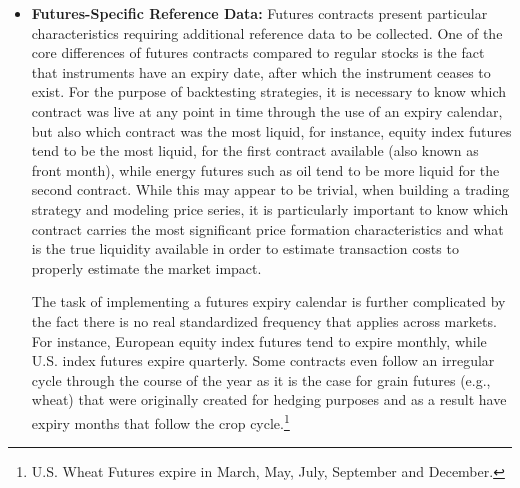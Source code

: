 \begin{itemize}
\item \textbf{Futures-Specific Reference Data:} Futures contracts present particular characteristics requiring additional reference data to be collected. One of the core differences of futures contracts compared to regular stocks is the fact that instruments have an expiry date, after which the instrument ceases to exist. For the purpose of backtesting strategies, it is necessary to know which contract was live at any point in time through the use of an expiry calendar, but also which contract was the most liquid, for instance, equity index futures tend to be the most liquid, for the first contract available (also known as front month), while energy futures such as oil tend to be more liquid for the second contract. While this may appear to be trivial, when building a trading strategy and modeling price series, it is particularly important to know which contract carries the most significant price formation characteristics and what is the true liquidity available in order to estimate transaction costs to properly estimate the market impact. 


The task of implementing a futures expiry calendar is further complicated by the fact there is no real standardized frequency that applies across markets. For instance, European equity index futures tend to expire monthly, while U.S. index futures expire quarterly. Some contracts even follow an irregular cycle through the course of the year as it is the case for grain futures (e.g., wheat) that were originally created for hedging purposes and as a result have expiry months that follow the crop cycle.\footnote{U.S. Wheat Futures expire in March, May, July, September and December.}



\end{itemize}
